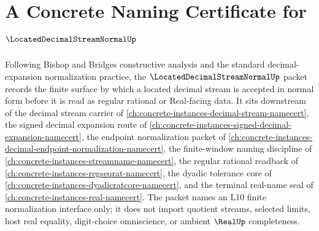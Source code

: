 \chapter{A Concrete Naming Certificate for $\LocatedDecimalStreamNormalUp$}
\label{ch:concrete-instances-located-decimal-stream-normal-namecert}

Following Bishop and Bridges constructive analysis and the standard decimal-expansion normalization practice, the $\LocatedDecimalStreamNormalUp$ packet records the finite surface by which a located decimal stream is accepted in normal form before it is read as regular rational or Real-facing data. It sits downstream of the decimal stream carrier of \autoref{ch:concrete-instances-decimal-stream-namecert}, the signed decimal expansion route of \autoref{ch:concrete-instances-signed-decimal-expansion-namecert}, the endpoint normalization packet of \autoref{ch:concrete-instances-decimal-endpoint-normalization-namecert}, the finite-window naming discipline of \autoref{ch:concrete-instances-streamname-namecert}, the regular rational readback of \autoref{ch:concrete-instances-regseqrat-namecert}, the dyadic tolerance core of \autoref{ch:concrete-instances-dyadicratcore-namecert}, and the terminal real-name seal of \autoref{ch:concrete-instances-real-namecert}. The packet names an L10 finite normalization interface only; it does not import quotient streams, selected limits, host real equality, digit-choice omniscience, or ambient $\RealUp$ completeness.

